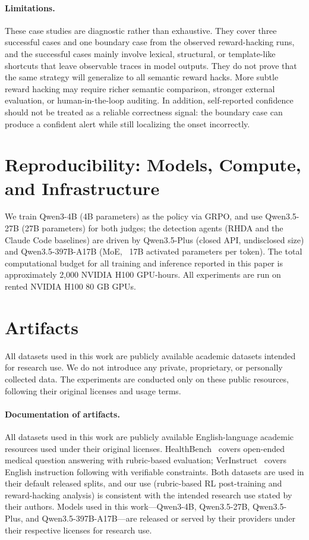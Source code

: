 \documentclass[11pt]{article}
\begin{document}
\paragraph{Limitations.}
These case studies are diagnostic rather than exhaustive. They cover three successful cases and one boundary case from the observed reward-hacking runs, and the successful cases mainly involve lexical, structural, or template-like shortcuts that leave observable traces in model outputs. They do not prove that the same strategy will generalize to all semantic reward hacks. More subtle reward hacking may require richer semantic comparison, stronger external evaluation, or human-in-the-loop auditing. In addition, self-reported confidence should not be treated as a reliable correctness signal: the boundary case can produce a confident alert while still localizing the onset incorrectly.


\section{Reproducibility: Models, Compute, and Infrastructure}
\label{app:reproducibility}
We train Qwen3-4B (4B parameters) as the policy via GRPO, and use Qwen3.5-27B (27B parameters) for both judges; the detection agents (RHDA and the Claude Code baselines) are driven by Qwen3.5-Plus (closed API, undisclosed size) and Qwen3.5-397B-A17B (MoE, ~17B activated parameters per token). The total computational budget for all training and inference reported in this paper is approximately 2,000 NVIDIA H100 GPU-hours. All experiments are run on rented NVIDIA H100 80 GB GPUs.

\section{Artifacts}

All datasets used in this work are publicly available academic datasets intended for research use. We do not introduce any private, proprietary, or personally collected data. The experiments are conducted only on these public resources, following their original licenses and usage terms.

\paragraph{Documentation of artifacts.}
All datasets used in this work are publicly available English-language academic resources used under their original licenses. HealthBench~\citep{aroraHealthBenchEvaluatingLarge2025} covers open-ended medical question answering with rubric-based evaluation; VerInstruct~\citep{pengVerIFVerificationEngineering2025} covers English instruction following with verifiable constraints. Both datasets are used in their default released splits, and our use (rubric-based RL post-training and reward-hacking analysis) is consistent with the intended research use stated by their authors. Models used in this work---Qwen3-4B, Qwen3.5-27B, Qwen3.5-Plus, and Qwen3.5-397B-A17B---are released or served by their providers under their respective licenses for research use.
\end{document}
